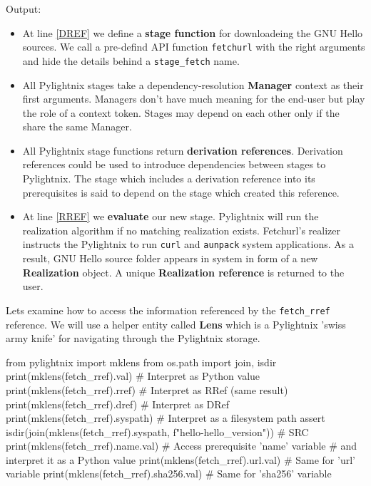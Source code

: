 \documentclass{article}
\newenvironment{pythontexcode}
  {\VerbatimEnvironment\begin{mdframed}[leftline=false,rightline=false]\begin{pyblock}[stdout][numbers=left]}
  {\end{pyblock}\end{mdframed}}
\newcommand{\mysmallstdout}{\begin{mdframed}\footnotesize{\texttt{\stdoutpythontex[verbatim][breaklines,breakafter=0123456789-/]}}\end{mdframed}}
\begin{document}
Output:

\mysmallstdout

\begin{itemize}

  \item At line \ref{DREF} we define a \textbf{stage function} for
    downloadeing the GNU Hello sources. We
    call a pre-defind API function \texttt{fetchurl} with the right
    arguments and hide the details behind a \texttt{stage\_fetch} name.

  \item All Pylightnix stages take a dependency-resolution \textbf{Manager}
    context as their first arguments. Managers don't have much meaning for
    the end-user but play the role of a context token. Stages may depend on
    each other only if the share the same Manager.

  \item All Pylightnix stage functions return \textbf{derivation
    references}. Derivation references could be used to introduce
    dependencies between stages to Pylightnix. The stage which includes a
    derivation reference into its prerequisites is said to depend on the
    stage which created this reference.

  \item At line \ref{RREF} we \textbf{evaluate} our new stage. Pylightnix will
    run the realization algorithm if no matching realization exists.
    Fetchurl's realizer instructs the Pylightnix to run \texttt{curl} and
    \texttt{aunpack} system applications. As a result, GNU Hello source folder
    appears in system in form of a new \textbf{Realization} object. A unique
    \textbf{Realization reference} is returned to the user.

\end{itemize}

Lets examine how to access the information referenced by the
\texttt{fetch\_rref} reference. We will use a helper entity called
\textbf{Lens} which is a Pylightnix 'swiss army knife' for navigating through
the Pylightnix storage.

\begin{pythontexcode}
from pylightnix import mklens
from os.path import join, isdir
print(mklens(fetch_rref).val)      # Interpret as Python value
print(mklens(fetch_rref).rref)     # Interpret as RRef (same result)
print(mklens(fetch_rref).dref)     # Interpret as DRef
print(mklens(fetch_rref).syspath)  # Interpret as a filesystem path
assert isdir(join(mklens(fetch_rref).syspath,
             f"hello-{hello_version}"))  # SRC \label{SRC}
print(mklens(fetch_rref).name.val) # Access prerequisite 'name' variable
                                   # and interpret it as a Python value
print(mklens(fetch_rref).url.val)  # Same for 'url' variable
print(mklens(fetch_rref).sha256.val)  # Same for 'sha256' variable
\end{pythontexcode}
\end{document}
